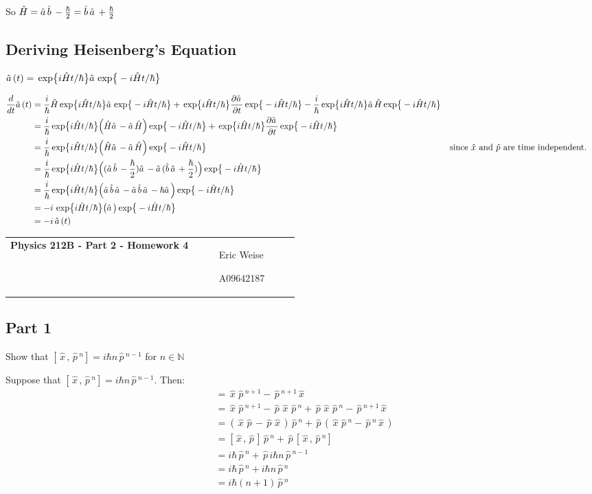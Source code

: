 \documentclass{article}
\newcommand{\assignment}[2]{
    \newpage
    \begin{tabular}{p{0.65\linewidth}p{0.25\linewidth}}
        {\bf\LARGE Physics 212B - Part #1 - Homework #2 }
        &
        \parbox[b]{0.24\textwidth}{
            \hfill Eric Weise

            \hfill A09642187
            }
    \end{tabular}
    \vspace{12pt}
    \newline
}
\renewcommand{\exp}[1]{\,\text{exp} \big\{ #1 \big\} }
\begin{document}
So
\( \hat{H}
    = \hat{a} \,\hat{b} \, - \frac{\hbar}{2}
    = \hat{b} \,\hat{a} \, + \frac{\hbar}{2}
\)

\subsection*{Deriving  Heisenberg's Equation}
\( \aop(t) = \exp{i\hat{H}t/\hbar} \aop \exp{-i\hat{H}t/\hbar} \)

\begin{align*}
    \frac{d}{dt} \aop(t)
    &= \frac{i}{\hbar}\hat{H} \exp{i\hat{H}t/\hbar} \aop \exp{-i\hat{H}t/\hbar} +
        \exp{i\hat{H}t/\hbar} \frac{\partial \aop}{\partial t} \exp{-i\hat{H}t/\hbar} - \frac{i}{\hbar} \exp{i\hat{H}t/\hbar} \aop \hat{H} \exp{-i\hat{H}t/\hbar} \\
    &= \frac{i}{\hbar} \exp{i\hat{H}t/\hbar} \Big( \hat{H}\aop - \aop\hat{H} \Big) \exp{-i\hat{H}t/\hbar} +
        \exp{i\hat{H}t/\hbar} \frac{\partial \aop}{\partial t} \exp{-i\hat{H}t/\hbar} \\
    &= \frac{i}{\hbar} \exp{i\hat{H}t/\hbar} \Big( \hat{H}\aop - \aop\hat{H} \Big) \exp{-i\hat{H}t/\hbar}
        && \text{since $\hat{x}$ and $\hat{p}$ are time independent.}\\
    &= \frac{i}{\hbar} \exp{i\hat{H}t/\hbar} \Big((\aop\bop - \frac{\hbar}{2}) \aop - \aop(\bop\aop + \frac{\hbar}{2}) \Big) \exp{-i\hat{H}t/\hbar} \\
    &= \frac{i}{\hbar} \exp{i\hat{H}t/\hbar} \Big(\aop\bop\aop - \aop\bop\aop - \hbar\aop \Big) \exp{-i\hat{H}t/\hbar} \\
    &= -i \, \exp{i\hat{H}t/\hbar} \big( \aop \big) \exp{-i\hat{H}t/\hbar} \\
    &= -i \, \aop(t)
\end{align*}


\assignment{2}{4}
\newcommand{\xopr}{ \, \hat{x} \,}
\newcommand{\popr}{ \, \hat{p} \,}

\subsection*{Part 1}
Show that
\( [ \xopr, \popr^n ] = i \hbar n \popr^{n-1} \)
for
\( n \in \mathds{N} \)

Suppose that
\( [\xopr,\popr^n] = i\hbar n \popr^{n-1} \).
Then:
\begin{align*}
    [ \xopr, \popr^{n+1} ]
    &= \xopr\popr^{n+1} - \popr^{n+1}\xopr \\
    &= \xopr\popr^{n+1} - \popr\xopr\popr^n + \popr\xopr\popr^n - \popr^{n+1}\xopr \\
    &= (\xopr\popr-\popr\xopr)\popr^n + \popr(\xopr\popr^n - \popr^n\xopr) \\
    &= [\xopr,\popr]\popr^n + \popr[\xopr,\popr^n] \\
    &= i\hbar \popr^n + \popr i\hbar n \popr^{n-1} \\
    &= i\hbar \popr^n + i\hbar n \popr^n \\
    &= i\hbar (n+1) \popr^n
\end{align*}
\end{document}
